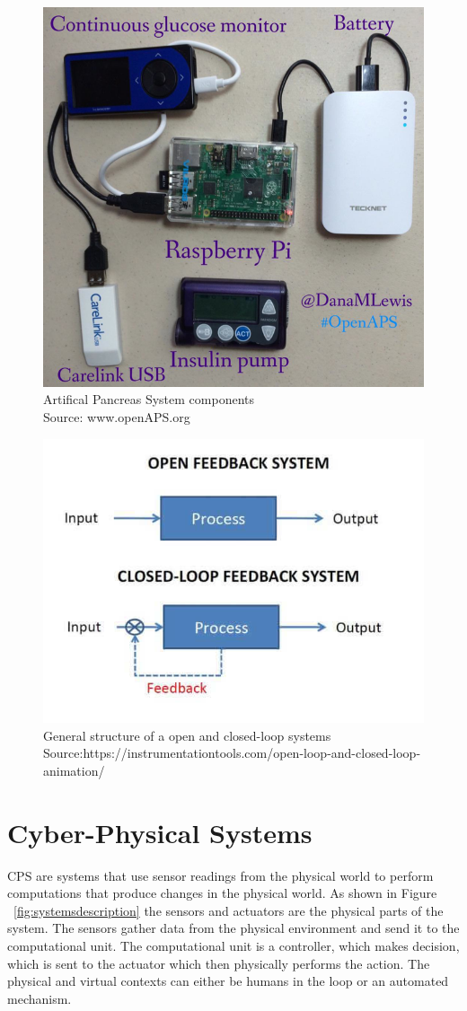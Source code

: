 \begin{figure}
	\centering
	\includegraphics[width=0.7\linewidth]{Images/APSrig}
	\caption{Artifical Pancreas System components \\
		Source: www.openAPS.org}
	\label{fig:apsrig}
\end{figure}



\begin{figure}
	\centering
	\includegraphics[width=0.7\linewidth]{Images/closedvsopen}
	\caption{General structure of a open and closed-loop systems 
		Source:https://instrumentationtools.com/open-loop-and-closed-loop-animation/ }
	\label{fig:closedvsopen}
\end{figure}


\section{Cyber-Physical Systems}
\ac{CPS} are systems that use sensor readings from the physical world to perform computations that produce changes in the physical  world.   
As shown in Figure ~\ref{fig:systemsdescription} the sensors and actuators are the physical parts of the system. 
The sensors gather data from the physical environment and send it to the computational unit. 
The computational unit is a controller, which makes decision, which is sent to the actuator which then physically performs the action.
The physical and virtual contexts can either be humans in the loop or an automated mechanism.

